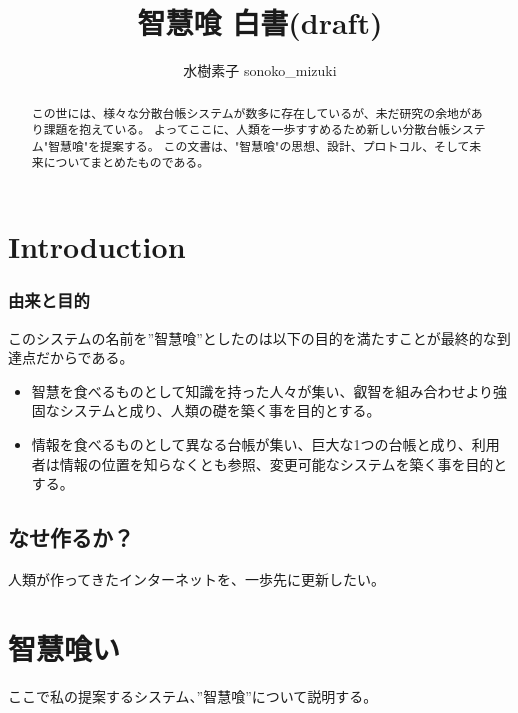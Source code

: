 \documentclass[10pt,a4paper]{jarticle}
\title{智慧喰 白書(draft)}
\author{水樹素子 sonoko\_mizuki}
\begin{document}
\maketitle

\begin{abstract}
この世には、様々な分散台帳システムが数多に存在しているが、未だ研究の余地があり課題を抱えている。
よってここに、人類を一歩すすめるため新しい分散台帳システム"智慧喰"を提案する。
この文書は、"智慧喰"の思想、設計、プロトコル、そして未来についてまとめたものである。
\end{abstract}

\begin{multicols}{2}


\section{Introduction}

\subsubsection{由来と目的}
このシステムの名前を”智慧喰”としたのは以下の目的を満たすことが最終的な到達点だからである。
\begin{itemize}
  \item 智慧を食べるものとして知識を持った人々が集い、叡智を組み合わせより強固なシステムと成り、人類の礎を築く事を目的とする。
  \item 情報を食べるものとして異なる台帳が集い、巨大な1つの台帳と成り、利用者は情報の位置を知らなくとも参照、変更可能なシステムを築く事を目的とする。
\end{itemize}

\subsection{なせ作るか？}
人類が作ってきたインターネットを、一歩先に更新したい。


\section{智慧喰い}
ここで私の提案するシステム、”智慧喰”について説明する。


\end{multicols}
\end{document}
